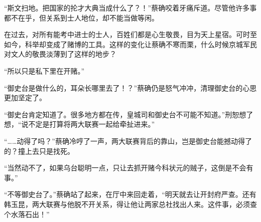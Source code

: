 “斯文扫地。把国家的抡才大典当成什么了？！”蔡确咬着牙痛斥道。尽管他许多事都不在乎，但关系到士人地位，却不能当做等闲。

在过去，对所有能考中进士的士人，百姓们都是心生敬畏，目为天上星宿。可时至如今，科举却变成了赌博的工具。这样的变化让蔡确不寒而栗，什么时候京城军民对文人的敬畏淡薄到了这样的地步？

“所以只是私下里在开赌。”

“御史台是做什么的，耳朵长哪里去了！？”蔡确仍是怒气冲冲，清理御史台的心思更加坚定了。

“御史台肯定知道了。很多地方都在传，皇城司和御史台不可能不知道。”刑恕想了想，“说不定是打算将两大联赛一起给牵扯进来。”

“……动得了吗？”蔡确冷哼了一声，两大联赛背后的靠山，岂是御史台能撼动得了的？撞上去只是找死。

“当然动不了，如果乌台聪明一点，只让去抓开赌今科状元的贼子，这倒是不会有事。”

“不等御史台了。”蔡确站了起来，在厅中来回走着，“明天就去让开封府严查。还有韩玉昆，两大联赛与他脱不开关系，得让他让两家总社找出人来。这件事，必须查个水落石出！”

